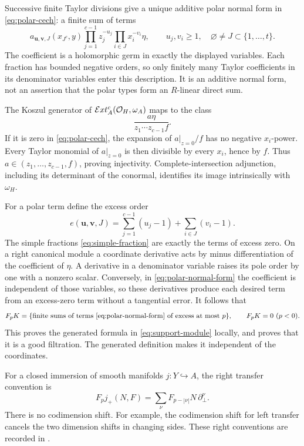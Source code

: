 Successive finite Taylor divisions give a unique additive polar normal
form in \eqref{eq:polar-cech}: a finite sum of terms
\begin{equation}\label{eq:polar-normal-form}
 a_{\mathbf u,\mathbf v,J}(x_{J^c},y)
 \prod_{j=1}^{c-1}z_j^{-u_j}\prod_{i\in J}x_i^{-v_i}\eta,
 \qquad u_j,v_i\geq1,\quad \varnothing\ne J\subset\{1,\ldots,t\}.
\end{equation}
The coefficient is a holomorphic germ in exactly the displayed
variables.  Each fraction has bounded negative orders, so only finitely
many Taylor coefficients in its denominator variables enter this
description.  It is an additive normal form, not an assertion that the
polar types form an \(R\)-linear direct sum.

The Koszul generator of \(\mathcal{E}xt^c_A(\mathcal O_H,\omega_A)\) maps to
the class
\begin{equation}\label{eq:simple-fraction}
 \frac{a\eta}{z_1\cdots z_{c-1}f}.
\end{equation}
If it is zero in \eqref{eq:polar-cech}, the expansion of \(a|_{z=0}/f\)
has no negative \(x_i\)-power.  Every Taylor monomial of \(a|_{z=0}\)
is then divisible by every \(x_i\), hence by \(f\).  Thus
\(a\in(z_1,\ldots,z_{c-1},f)\), proving injectivity.  Complete-intersection
adjunction, including its determinant of the conormal, identifies its
image intrinsically with \(\omega_H\).

For a polar term define the excess order
\[
 e(\mathbf u,\mathbf v,J)=
 \sum_{j=1}^{c-1}(u_j-1)+\sum_{i\in J}(v_i-1).
\]
The simple fractions \eqref{eq:simple-fraction} are exactly the terms
of excess zero.  On a right canonical module a coordinate derivative
acts by minus differentiation of the coefficient of \(\eta\).  A
derivative in a denominator variable raises its pole order by one with
a nonzero scalar.  Conversely, in \eqref{eq:polar-normal-form} the
coefficient is independent of those variables, so these derivatives
produce each desired term from an excess-zero term without a tangential
error.  It follows that
\begin{equation}\label{eq:pole-filtration}
 F_pK=\{\text{finite sums of terms \eqref{eq:polar-normal-form} of excess
 at most }p\},\qquad F_pK=0\ (p<0).
\end{equation}
This proves the generated formula in \eqref{eq:support-module} locally,
and proves that it is a good filtration.  The generated definition
makes it independent of the coordinates.

For a closed immersion of smooth manifolds \(j:Y\hookrightarrow A\),
the right transfer convention is
\begin{equation}\label{eq:right-transfer}
 F_pj_+(N,F)=\sum_{\nu}F_{p-|\nu|}N\,\partial_{\perp}^{\nu}.
\end{equation}
There is no codimension shift.  For example, the codimension shift for
left transfer cancels the two dimension shifts in changing sides.  These
right conventions are recorded in
\cite[Section~1.1, equations~(1.1.2)--(1.1.4)]{FujinoFujisawaSaito2014}.

